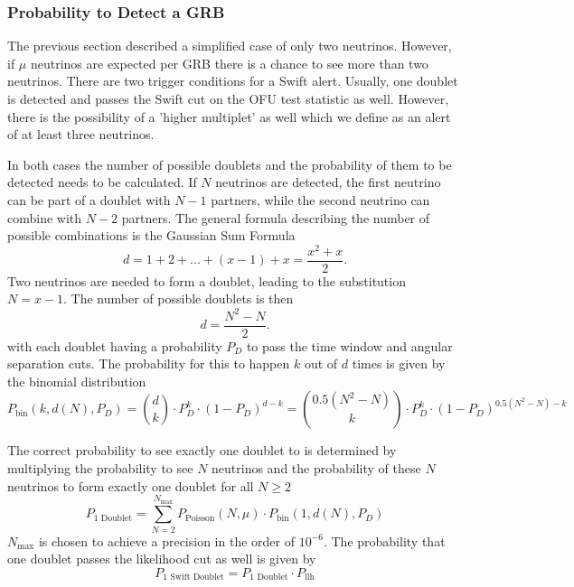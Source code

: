 \subsubsection{Probability to Detect a GRB}
The previous section described a simplified case of only two neutrinos. 
However, if $\mu$ neutrinos are expected per GRB there is a chance to see more 
than two neutrinos. There are two trigger conditions for a Swift alert. 
Usually, one doublet is 
detected and passes the Swift cut on the OFU test statistic as 
well. However, there is the 
possibility of a 'higher multiplet' as well which we define as an alert of at 
least three neutrinos.

In both cases the number of possible 
doublets and the probability of them to be detected needs to be calculated. If 
$N$ neutrinos are detected, the first neutrino can be part of a doublet with 
$N-1$ partners, while the second neutrino can combine with $N-2$ partners. The 
general formula describing the number of possible combinations is the Gaussian 
Sum Formula
\begin{equation}
 d = 1 + 2 + ... + (x-1) + x= \frac{x^2 + x}{2}.
\end{equation}
Two neutrinos are needed to form a doublet, leading to the substitution $N = 
x-1$. The number of possible doublets is then 
\begin{equation}
 d = \frac{N^2 - N}{2}.
\end{equation}
with each doublet having a probability $P_D$ to pass the time window and 
angular separation cuts. The probability for this to happen $k$ out of $d$ 
times is given by the binomial distribution
\begin{equation}
 P_\text{bin} ( k, d(N), P_D) =  \binom{d}{k} \cdot P_{D}^k \cdot 
(1 - P_{D})^{d-k} = \binom{0.5 (N^2 - N)}{k} \cdot P_{D}^k \cdot 
(1 - P_{D})^{0.5(N^2 -N) -k}
\end{equation}

The correct probability to see exactly one doublet to is determined by 
multiplying the probability to see $N$ neutrinos and the probability of these 
$N$ 
neutrinos to form exactly one doublet for all $N \geq 2$
\begin{equation}
 P_\text{1 Doublet} = \sum_{N=2}^{N_\text{max}} P_\text{Poisson}(N, 
\mu) \cdot P_\text{bin} (1, d(N), P_D)
\end{equation}
$N_\text{max}$ is chosen to achieve a precision in the order of $10^{-6}$.
The probability that one doublet passes the likelihood cut as well is given by
\begin{equation}
 P_\text{1 Swift Doublet} = P_\text{1 Doublet} \cdot P_\text{llh}
\end{equation}

